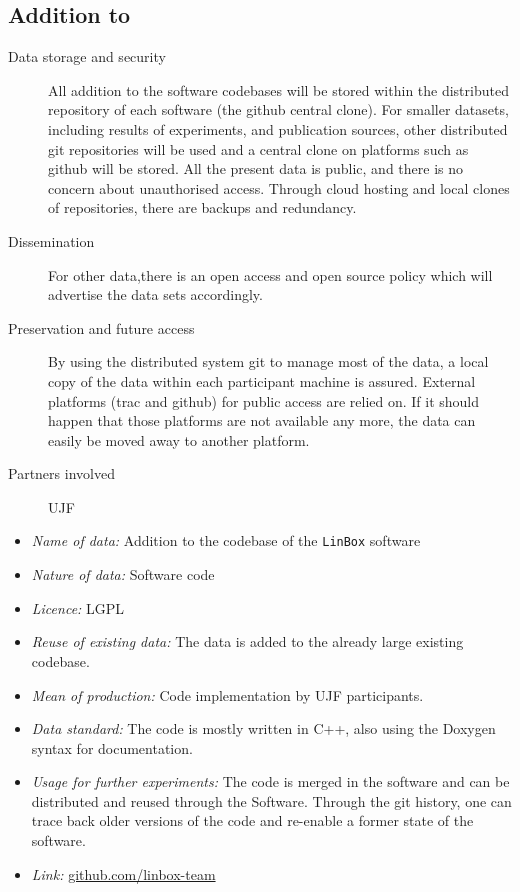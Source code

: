 \documentclass{deliverablereport}
\begin{document}
\begin{enumerate}
\subsection{Addition to \Linbox}

\begin{description}
\item[Data storage and security] All addition to the software codebases will be stored within the distributed repository of each software (the github central clone). For smaller datasets, including results of experiments, and publication sources, other distributed git repositories will be used and a central clone on platforms such as github will be stored. All the present data is public, and there is no concern about unauthorised access. Through cloud hosting and local clones of repositories, there are backups and redundancy.
\item[Dissemination] For other data,there is an open access and open source policy which will advertise the data sets accordingly.
\item[Preservation and future access] By using the distributed system git to manage most of the data, a local copy of the data within each participant machine is assured. External platforms (trac and github) for public access are relied on. If it should happen that those platforms are not available any more, the data can easily be moved away to another platform.
\item[Partners involved] UJF
\end{description}

\begin{itemize}
\item\textit{Name of data:} Addition to the codebase of the \texttt{LinBox} software
\item\textit{Nature of data:} Software code
\item\textit{Licence:} LGPL
\item\textit{Reuse of existing data:} The data is added to the already large existing codebase.
\item\textit{Mean of production:} Code implementation by UJF participants.
\item\textit{Data standard:} The code is mostly written in C++, also using the Doxygen syntax for documentation.
\item\textit{Usage for further experiments:} The code is merged in the software and can be distributed and reused through the Software. Through the git history,
one can trace back older versions of the code and re-enable a former state of the software.
\item\textit{Link:} \href{https://github.com/linbox-team}{github.com/linbox-team}
\end{itemize}




\end{enumerate}
\end{document}
